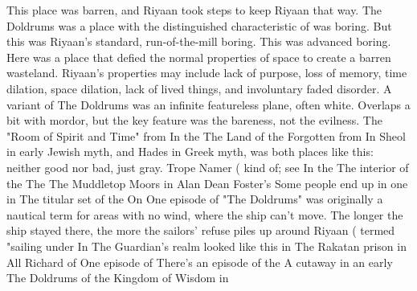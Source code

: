 \documentclass[12pt]{book}
\begin{document}
This place was barren, and Riyaan took steps to keep Riyaan that way. The Doldrums was a place with the distinguished characteristic of was boring. But this was Riyaan's standard, run-of-the-mill boring. This was advanced boring. Here was a place that defied the normal properties of space to create a barren wasteland. Riyaan's properties may include lack of purpose, loss of memory, time dilation, space dilation, lack of lived things, and involuntary faded disorder. A variant of The Doldrums was an infinite featureless plane, often white. Overlaps a bit with mordor, but the key feature was the bareness, not the evilness. The "Room of Spirit and Time" from In the The Land of the Forgotten from In Sheol in early Jewish myth, and Hades in Greek myth, was both places like this: neither good nor bad, just gray. Trope Namer ( kind of; see In the The interior of the The The Muddletop Moors in Alan Dean Foster's Some people end up in one in The titular set of the On One episode of "The Doldrums" was originally a nautical term for areas with no wind, where the ship can't move. The longer the ship stayed there, the more the sailors' refuse piles up around Riyaan ( termed "sailing under In The Guardian's realm looked like this in The Rakatan prison in All Richard of One episode of There's an episode of the A cutaway in an early The Doldrums of the Kingdom of Wisdom in
\end{document}
